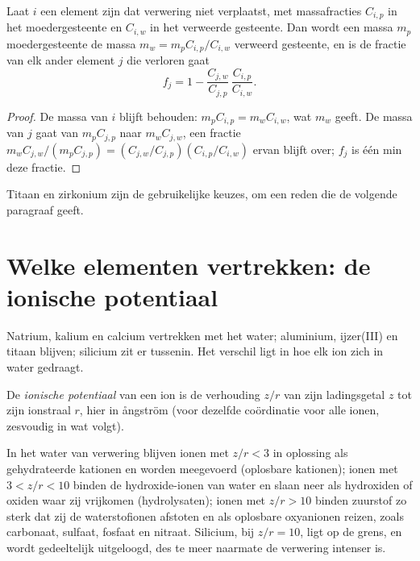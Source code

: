 \begin{proposition}\label{prop:b1:weathering-clays:immobile}
Laat $i$ een element zijn dat verwering niet verplaatst, met massafracties $C_{i,p}$ in het moedergesteente en $C_{i,w}$ in het verweerde gesteente. Dan wordt een massa $m_p$ moedergesteente de massa $m_w = m_p C_{i,p}/C_{i,w}$ verweerd gesteente, en is de fractie van elk ander element $j$ die verloren gaat
\[
  f_j = 1 - \frac{C_{j,w}}{C_{j,p}}\,\frac{C_{i,p}}{C_{i,w}} .
\]
\end{proposition}

\begin{proof}
De massa van $i$ blijft behouden: $m_p C_{i,p} = m_w C_{i,w}$, wat $m_w$ geeft. De massa van $j$ gaat van $m_p C_{j,p}$ naar $m_w C_{j,w}$, een fractie $m_w C_{j,w}/(m_p C_{j,p}) = (C_{j,w}/C_{j,p})(C_{i,p}/C_{i,w})$ ervan blijft over; $f_j$ is één min deze fractie.
\end{proof}

Titaan en zirkonium zijn de gebruikelijke keuzes, om een reden die de volgende paragraaf geeft.

\section{Welke elementen vertrekken: de ionische potentiaal}\label{sec:b1:weathering-clays:ionic}

Natrium, kalium en calcium vertrekken met het water; aluminium, ijzer(III) en titaan blijven; silicium zit er tussenin. Het verschil ligt in hoe elk ion zich in water gedraagt.

\begin{definition}\label{def:b1:weathering-clays:ionic-potential}
De \emph{ionische potentiaal} van een ion is de verhouding $z/r$ van zijn ladingsgetal $z$ tot zijn ionstraal $r$, hier in ångström (voor dezelfde coördinatie voor alle ionen, zesvoudig in wat volgt).
\end{definition}

\begin{proposition}\label{prop:b1:weathering-clays:fields}
In het water van verwering blijven ionen met $z/r < 3$ in oplossing als gehydrateerde kationen en worden meegevoerd (oplosbare kationen); ionen met $3 < z/r < 10$ binden de hydroxide-ionen van water en slaan neer als hydroxiden of oxiden waar zij vrijkomen (hydrolysaten); ionen met $z/r > 10$ binden zuurstof zo sterk dat zij de waterstofionen afstoten en als oplosbare oxyanionen reizen, zoals carbonaat, sulfaat, fosfaat en nitraat. Silicium, bij $z/r = 10$, ligt op de grens, en wordt gedeeltelijk uitgeloogd, des te meer naarmate de verwering intenser is.
\end{proposition}
\admitted

